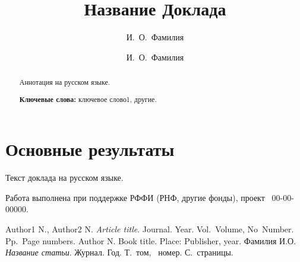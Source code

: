 \documentclass[12pt]{llncs}
\begin{document}

\title{Название Доклада}
\author{И.~О.~Фамилия
  \and
И.~О.~Фамилия} %

\maketitle

\begin{abstract}
Аннотация на русском языке.

{\bf Ключевые слова:} ключевое слово1, другие.
\end{abstract}

\section{Основные результаты} %

Текст доклада на русском языке.

Работа выполнена при поддержке РФФИ (РНФ, другие фонды), проект \textnumero~00-00-00000.


\begin{thebibliography}{9}
Author1 N., Author2 N.  {\it Article title}. Journal. Year. Vol.~Volume, No~Number. Pp.~Page numbers.
Author N. Book title. Place: Publisher, year.
 Фамилия И.О. {\it Название статьи}. Журнал. Год. Т.~том,  \textnumero~номер. С.~страницы.
\end{thebibliography}
\end{document}

